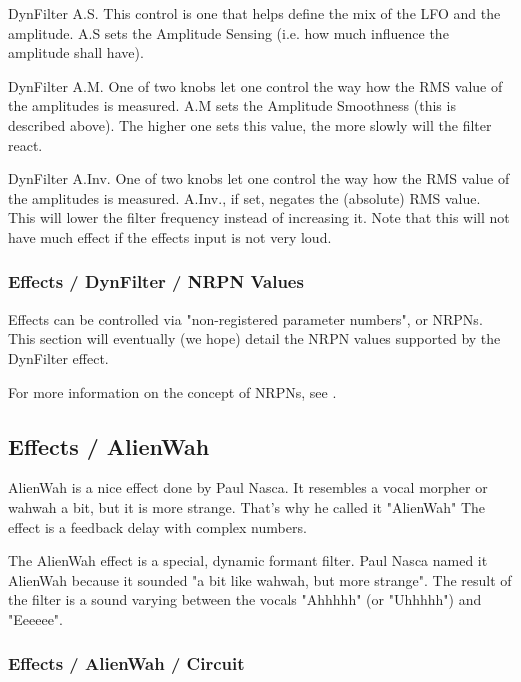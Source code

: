    DynFilter A.S.
   This control is one that helps define the mix of the LFO and the
   amplitude.
   A.S sets the Amplitude Sensing (i.e. how much influence the amplitude
   shall have).

   DynFilter A.M.
   One of two knobs let one control the way how the RMS value of the
   amplitudes is measured.
   A.M sets the Amplitude Smoothness (this is described above). The higher
   one sets this value, the more slowly will the filter react.

   DynFilter A.Inv.  One of two knobs let one control the way how the RMS
   value of the amplitudes is measured.  A.Inv., if set, negates the
   (absolute) RMS value. This will lower the filter frequency instead of
   increasing it. Note that this will not have much effect if the effects
   input is not very loud.

\subsubsection{Effects / DynFilter / NRPN Values}
\label{subsubsec:effects_edit_dynfilter_nrpn}

   Effects can be controlled via "non-registered parameter numbers", or NRPNs.
   This section will eventually (we hope)
   detail the NRPN values supported by the DynFilter effect.

   For more information on the concept of NRPNs, see
   .


\subsection{Effects / AlienWah}
\label{subsec:effects_edit_alienwah}

   AlienWah is a nice effect done by Paul Nasca. It resembles a vocal morpher
   or wahwah a bit, but it is more strange. That's why he called it "AlienWah"
   The effect is a feedback delay with complex numbers. 

   The AlienWah effect is a special, dynamic formant filter.
   Paul Nasca named it AlienWah because it sounded "a bit like
   wahwah, but more strange". The result of the filter is a sound varying
   between the vocals "Ahhhhh" (or "Uhhhhh") and "Eeeeee".

\subsubsection{Effects / AlienWah / Circuit}
\label{subsubsec:effects_edit_alienwah_circuit}

